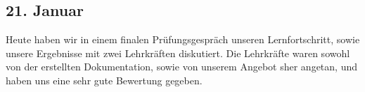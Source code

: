 \subsection{21. Januar}
Heute haben wir in einem finalen Prüfungsgespräch unseren Lernfortschritt, sowie unsere Ergebnisse mit zwei Lehrkräften diskutiert. Die Lehrkräfte waren sowohl von der erstellten Dokumentation, sowie von unserem Angebot sher angetan, und haben uns eine sehr gute Bewertung gegeben.